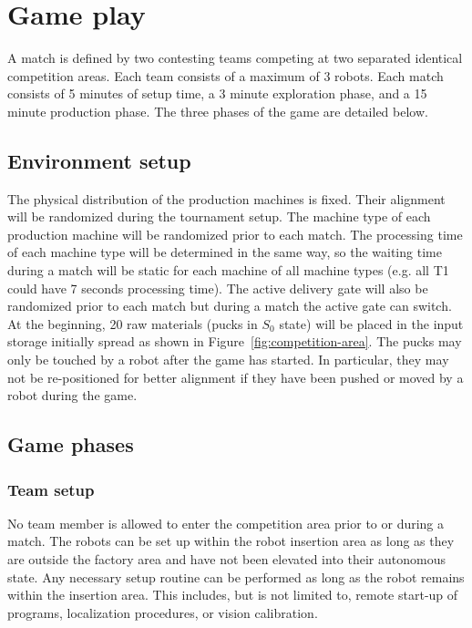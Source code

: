 \documentclass[12pt,twoside]{article}
\newcommand{\reffig}[1]{Figure~\ref{#1}}
\begin{document}

\section{Game play}
A match is defined by two contesting teams competing at two separated
identical competition areas. Each team consists of a maximum of 3
robots. Each match consists of 5 minutes of setup time,
a 3 minute exploration phase, and a 15 minute production phase.
The three phases of the game are detailed below.

\subsection{Environment setup}
\label{sec:env-setup}

The physical distribution of the production machines is fixed. Their
alignment will be randomized during the tournament setup. The machine
type of each production machine will be randomized prior to each
match. The processing time of each machine type will be determined in
the same way, so the waiting time during a match will be static for
each machine of all machine types (e.g. all T1 could have 7 seconds
processing time). The active delivery gate will also be randomized
prior to each match but during a match the active gate can switch.  At
the beginning, 20 raw materials (pucks in $S_0$ state) will be placed
in the input storage initially spread as shown in
\reffig{fig:competition-area}. The pucks may only be touched by a
robot after the game has started. In particular, they may not be
re-positioned for better alignment if they have been pushed or moved by
a robot during the game.

\subsection{Game phases}
\label{sec:game-phases}

\subsubsection{Team setup}
\label{sec:team-setup}
No team member is allowed to enter the competition area prior to or
during a match. The robots can be set up within the robot insertion
area as long as they are outside the factory area and have not been
elevated into their autonomous state. Any necessary setup routine can
be performed as long as the robot remains within the insertion
area. This includes, but is not limited to, remote start-up of
programs, localization procedures, or vision calibration.
\end{document}
